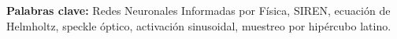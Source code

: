 \documentclass[runningheads]{llncs}
\begin{document}
\noindent\textbf{Palabras clave:} Redes Neuronales Informadas por
F\'{i}sica, SIREN, ecuaci\'{o}n de Helmholtz, speckle \'{o}ptico,
activaci\'{o}n sinusoidal, muestreo por hip\'{e}rcubo latino.









\end{document}
